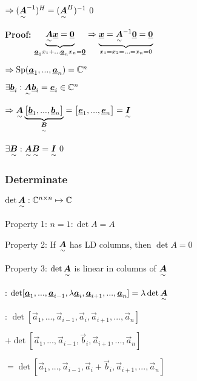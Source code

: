 $\Rightarrow(\ma{A}^{-1})^H=(\ma{A}^H)^{-1}$\qed


\textbf{Proof:} $\underbrace{\ma{A}\vec{x}=\vec{0}}_{\vec{a}_1x_1+...\vec{a}_nx_n=\vec{0}}
\Rightarrow \underbrace{\vec{x}=\ma{A}^{-1}\vec{0}=\vec{0}}_{x_1=x_2=...=x_n=0}$

$\Rightarrow \Sp(\vec{a}_1,...,\vec{a}_n)=\mathbb{C}^n$

$\exists \vec{b}_i: \ma{A}\vec{b}_i=\vec{e}_i \in \mathbb{C}^n$

$\Rightarrow \ma{A}\underbrace{\begin{bmatrix}\vec{b}_1,...,\vec{b}_n\end{bmatrix}}_{\ma{B}}=\begin{bmatrix}\vec{e}_1,...,\vec{e}_n\end{bmatrix}=\ma{I}$

$\exists \ma{B}: \ma{A}\ma{B}=\ma{I}$\qed


\subsubsection{Determinate}
$\det \ma{A}: \mathbb{C}^{n\times n}\mapsto \mathbb{C}$

Property 1: $n=1: \det A=A$

Property 2: If $\ma{A}$ has LD columns, then $\det A=0$

Property 3: $\det \ma{A}$ is linear in columns of $\ma{A}$

\quad {}: $\det [\vec{a}_1,...,\vec{a}_{i-1},\lambda\vec{a}_i,\vec{a}_{i+1},...,\vec{a}_n]=\lambda \det \ma{A}$

\quad {}: $\det [\vec{a}_1,...,\vec{a}_{i-1},\vec{a}_i,\vec{a}_{i+1},...,\vec{a}_n]$

\qquad\quad$+\det [\vec{a}_1,...,\vec{a}_{i-1},\vec{b}_i,\vec{a}_{i+1},...,\vec{a}_n]$

\qquad\quad$=\det [\vec{a}_1,...,\vec{a}_{i-1},\vec{a}_i+\vec{b}_i,\vec{a}_{i+1},...,\vec{a}_n]$


